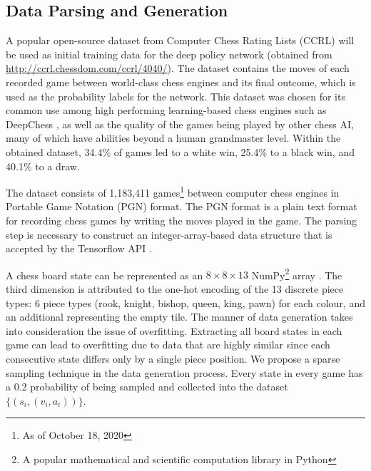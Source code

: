 \documentclass[letterpaper]{article} %
\begin{document}

\subsection{Data Parsing and Generation}

A popular open-source dataset from Computer Chess Rating Lists (CCRL) will be used as initial training data for the deep policy network (obtained from \url{http://ccrl.chessdom.com/ccrl/4040/}). The dataset contains the moves of each recorded game between world-class chess engines and its final outcome, which is used as the probability labels for the network. This dataset was chosen for its common use among high performing learning-based chess engines such as DeepChess \cite{deepchess}, as well as the quality of the games being played by other chess AI, many of which have abilities beyond a human grandmaster level. Within the obtained dataset, 34.4\% of games led to a white win, 25.4\% to a black win, and 40.1\% to a draw.

The dataset consists of 1,183,411 games\footnote{As of October 18, 2020} between computer chess engines in Portable Game Notation (PGN) format. The PGN format is a plain text format for recording chess games by writing the moves played in the game. The parsing step is necessary to construct an integer-array-based data structure that is accepted by the Tensorflow API \cite{tensorflow2015}.

A chess board state can be represented as an $8\times 8 \times 13$ NumPy\footnote{A popular mathematical and scientific computation library in Python} array \cite{harris2020array}. The third dimension is attributed to the one-hot encoding of the 13 discrete piece types: 6 piece types (rook, knight, bishop, queen, king, pawn) for each colour, and an additional representing the empty tile. The manner of data generation takes into consideration the issue of overfitting. Extracting all board states in each game can lead to overfitting due to data that are highly similar since each consecutive state differs only by a single piece position. We propose a sparse sampling technique in the data generation process. Every state in every game has a 0.2 probability of being sampled and collected into the dataset $\{(s_i, (v_i, a_i))\}$.
\end{document}
